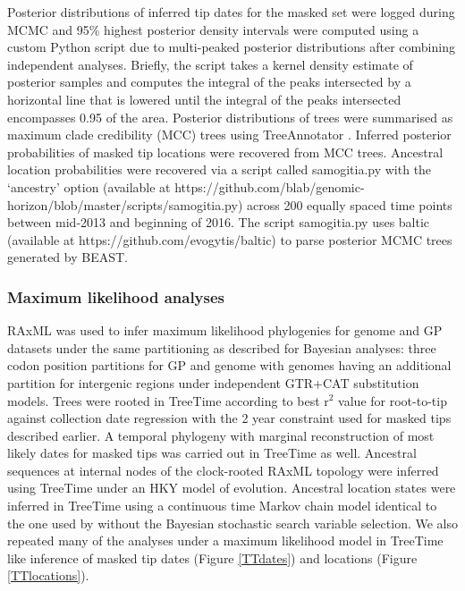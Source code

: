 \documentclass{bmcart}
\begin{document}
Posterior distributions of inferred tip dates for the masked set were logged during MCMC and 95\% highest posterior density intervals were computed using a custom Python script due to multi-peaked posterior distributions after combining independent analyses.
Briefly, the script takes a kernel density estimate of posterior samples and computes the integral of the peaks intersected by a horizontal line that is lowered until the integral of the peaks intersected encompasses 0.95 of the area.
Posterior distributions of trees were summarised as maximum clade credibility (MCC) trees using TreeAnnotator \cite{suchard_bayesian_2018}.
Inferred posterior probabilities of masked tip locations were recovered from MCC trees.
Ancestral location probabilities were recovered via a script called samogitia.py with the `ancestry' option (available at https://github.com/blab/genomic-horizon/blob/master/scripts/samogitia.py) across 200 equally spaced time points between mid-2013 and beginning of 2016.
The script samogitia.py uses baltic (available at https://github.com/evogytis/baltic) to parse posterior MCMC trees generated by BEAST.

\subsubsection*{Maximum likelihood analyses}
RAxML \cite{stamatakis_raxml_2014} was used to infer maximum likelihood phylogenies for genome and GP datasets under the same partitioning as described for Bayesian analyses: three codon position partitions for GP and genome with genomes having an additional partition for intergenic regions under independent GTR+CAT substitution models.
Trees were rooted in TreeTime according to best r$^{2}$ value for root-to-tip against collection date regression with the 2 year constraint used for masked tips described earlier.
A temporal phylogeny with marginal reconstruction of most likely dates for masked tips was carried out in TreeTime \cite{sagulenko_treetime:_2018} as well.
Ancestral sequences at internal nodes of the clock-rooted RAxML topology were inferred using TreeTime under an HKY model \cite{hky_1985} of evolution.
Ancestral location states were inferred in TreeTime using a continuous time Markov chain model identical to the one used by \cite{lemey_bayesian_2009} without the Bayesian stochastic search variable selection.
We also repeated many of the analyses under a maximum likelihood model in TreeTime \cite{sagulenko_treetime:_2018} like inference of masked tip dates (Figure \ref{TTdates}) and locations (Figure \ref{TTlocations}).
\end{document}
